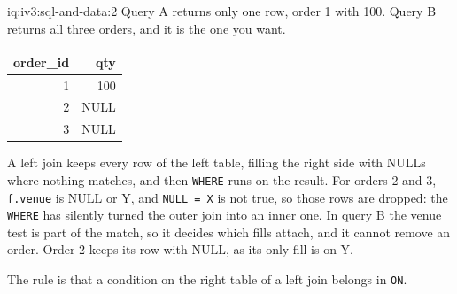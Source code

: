 \begin{solution}{iq:iv3:sql-and-data:2}
Query A returns only one row, order 1 with 100. Query B returns all three orders, and it is the one you want.
\begin{center}\small
\begin{tabular}{rr}
order\_id & qty\\\hline
1 & 100\\
2 & NULL\\
3 & NULL
\end{tabular}
\end{center}
A left join keeps every row of the left table, filling the right side with NULLs where nothing matches, and then \texttt{WHERE} runs on the result. For orders 2 and 3, \texttt{f.venue} is NULL or Y, and \texttt{NULL = \textquotesingle{}X\textquotesingle{}} is not true, so those rows are dropped: the \texttt{WHERE} has silently turned the outer join into an inner one. In query B the venue test is part of the match, so it decides which fills attach, and it cannot remove an order. Order 2 keeps its row with NULL, as its only fill is on Y.

The rule is that a condition on the right table of a left join belongs in \texttt{ON}.

\end{solution}

